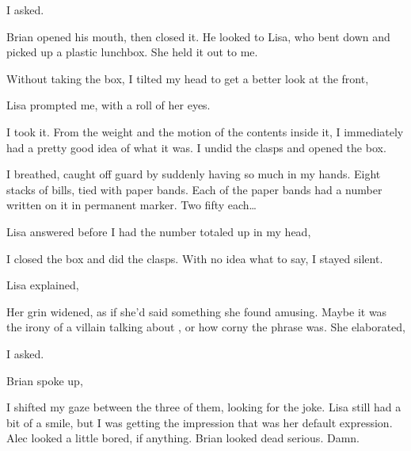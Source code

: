  I asked.

Brian opened his mouth, then closed it. He looked to Lisa, who bent down and picked up a plastic lunchbox. She held it out to me.


Without taking the box, I tilted my head to get a better look at the front, 

 Lisa prompted me, with a roll of her eyes.

I took it. From the weight and the motion of the contents inside it, I immediately had a pretty good idea of what it was. I undid the clasps and opened the box.

 I breathed, caught off guard by suddenly having so much in my hands. Eight stacks of bills, tied with paper bands. Each of the paper bands had a number written on it in permanent marker. Two fifty each\ldots{}

Lisa answered before I had the number totaled up in my head, 

I closed the box and did the clasps. With no idea what to say, I stayed silent.

 Lisa explained, 

Her grin widened, as if she'd said something she found amusing. Maybe it was the irony of a villain talking about , or how corny the phrase was. She elaborated, 

 I asked.

 Brian spoke up, 

I shifted my gaze between the three of them, looking for the joke. Lisa still had a bit of a smile, but I was getting the impression that was her default expression. Alec looked a little bored, if anything. Brian looked dead serious. Damn.

